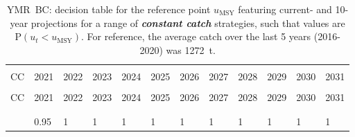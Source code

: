 \documentclass[11pt]{book}
\newcommand{\umsy}{u_\mathrm{MSY}}
\newcommand{\itbf}[1]{\textit{\textbf{#1}}}
\begin{document}
\begin{longtable}[c]{>{\raggedright\let\newline\\\arraybackslash\hspace{0pt}}p{0.48in}>{\raggedleft\let\newline\\\arraybackslash\hspace{0pt}}p{0.48in}>{\raggedleft\let\newline\\\arraybackslash\hspace{0pt}}p{0.51in}>{\raggedleft\let\newline\\\arraybackslash\hspace{0pt}}p{0.51in}>{\raggedleft\let\newline\\\arraybackslash\hspace{0pt}}p{0.51in}>{\raggedleft\let\newline\\\arraybackslash\hspace{0pt}}p{0.51in}>{\raggedleft\let\newline\\\arraybackslash\hspace{0pt}}p{0.51in}>{\raggedleft\let\newline\\\arraybackslash\hspace{0pt}}p{0.51in}>{\raggedleft\let\newline\\\arraybackslash\hspace{0pt}}p{0.51in}>{\raggedleft\let\newline\\\arraybackslash\hspace{0pt}}p{0.51in}>{\raggedleft\let\newline\\\arraybackslash\hspace{0pt}}p{0.48in}>{\raggedleft\let\newline\\\arraybackslash\hspace{0pt}}p{0.48in}}
  \caption{YMR~BC: decision table for the reference point $\umsy$ featuring current- and 10-year projections for a range of \itbf{constant catch} strategies, such that values are P$(u_t < \umsy)$.  For reference, the average catch over the last 5 years (2016-2020) was 1272~t. } \label{tab:ymr.gmu.umsy.CCs}\\  \hline\\[-2.2ex]  CC  & 2021 & 2022 & 2023 & 2024 & 2025 & 2026 & 2027 & 2028 & 2029 & 2030 & 2031 \\[0.2ex]\hline\\[-1.5ex]  \endfirsthead   \hline  CC  & 2021 & 2022 & 2023 & 2024 & 2025 & 2026 & 2027 & 2028 & 2029 & 2030 & 2031 \\[0.2ex]\hline\\[-1.5ex]  \endhead  \hline\\[-2.2ex]   \endfoot  \hline \endlastfoot  0 & 0.95 & 1 & 1 & 1 & 1 & 1 & 1 & 1 & 1 & 1 & 1 \\ 

\end{longtable}
\end{document}
